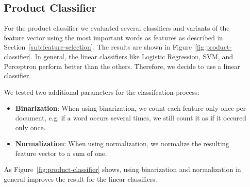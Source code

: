 \subsection{Product Classifier}
For the product classifier we evaluated several classifiers and variants of the feature vector using the most important words as features as described in Section~\ref{sub:feature-selection}.
The results are shown in Figure~\ref{fig:product-classifier}.
In general, the linear classifiers like Logistic Regression, SVM, and Perceptron perform better than the others.
Therefore, we decide to use a linear classifier.

We tested two additional parameters for the classifcation process:
\begin{itemize}
	\item
		\textbf{Binarization}:
			When using binarization, we count each feature only once per document, e.g. if a word occurs several times, we still count it as if it occured only once.
	\item
		\textbf{Normalization}:
			When using normalization, we normalize the resulting feature vector to a sum of one.
\end{itemize}
As Figure~\ref{fig:product-classifier} shows, using binarization and normalization in general improves the result for the linear classifiers.

